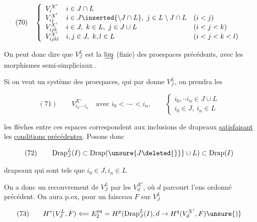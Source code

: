 
\[
(70)\quad\left\{\begin{array}{lll}
V_i^{X'}&i\in J\cap L&\\
V_{ij}^{X'}&i\in J\inserted{\setminus J\cap L},\ j\in L\setminus J\cap L&(i<j)\\
V_{ijk}^{X'}&i\in J,\ k\in L,\ j\in J\cup L&(i<j<k)\\
V_{ijkl}^{X'}&i,j\in J,\ k,l\in L&(i<j<k<l)
\end{array}\right.
\]


On peut donc dire que $V_J^L$ est la $\varinjlim$ (finie) des proespaces précédents, avec  les morphismes semi-simpliciaux  .

Si on veut un système  des proespaces,  qui par  \inserted{$\unsure{\varinjlim|\underline{\lim}}$} donne $V_J^L$, on prendra les

\[
(71)\qquad V_{i_0\mathord{\cdot}\mathord{-}i_n}^{X'}\quad\text{avec }i_0<\mathord{\cdot}\mathord{-}<i_n,\qquad
\left\{\begin{array}{l}
i_0,\mathord{\cdot}\mathord{\cdot}i_n\in J\cup L\\
i_0\in J,\ i_n\in L
\end{array}\right.
\]

les flèches entre ces espaces correspondent aux inclusions de drapeaux \uline{satisfaisant} les \uline{conditions précédentes}. Posons donc

\[
(72)\qquad\operatorname{Drap}_J^L(I)\subset\operatorname{Drap}(\unsure{J\deleted{\}}}\cup L)\subset\operatorname{Drap}(I)
\]

drapeaux  qui sont tels que $i_0\in J,i_n\in L$

On a donc un recouvrement de $V_J^L$ par les $V_d^{X'}$, où $d$ parcourt l'ens ordonné précédent. On aura p.ex, pour un faisceau $F$ sur $V_J^L$

\[
(73)\qquad H^*(V_J^L,F)\Longleftarrow E_2^{pq}=H^p(\operatorname{Drap}_J^L(I),d\to H^q(V_d^{X'},F)\unsure{)}
\]

